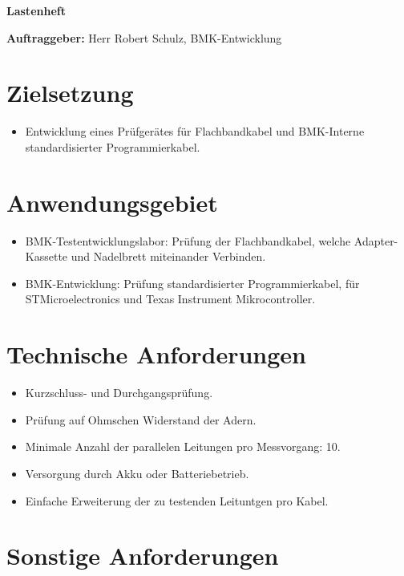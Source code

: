 \documentclass[a4paper,11pt]{scrartcl}
\begin{document}
\begin{center}
	\begin{huge}
	\textbf{Lastenheft}
	\end{huge}
\end{center}

\textbf{Auftraggeber:}
Herr Robert Schulz, BMK-Entwicklung


\section{Zielsetzung}

\begin{itemize}
	\item{Entwicklung eines Prüfgerätes für Flachbandkabel und BMK-Interne standardisierter Programmierkabel.}	
\end{itemize}

\section{Anwendungsgebiet}

\begin{itemize}
	\item{BMK-Testentwicklungslabor: Prüfung der Flachbandkabel, welche Adapter-Kassette und Nadelbrett miteinander Verbinden.}
	
	\item{BMK-Entwicklung: Prüfung standardisierter Programmierkabel, für STMicroelectronics und Texas Instrument Mikrocontroller.}
\end{itemize}

\section{Technische Anforderungen}

\begin{itemize}
	\item{Kurzschluss- und Durchgangsprüfung.}
	\item{Prüfung auf Ohmschen Widerstand der Adern.}
	\item{Minimale Anzahl der parallelen Leitungen pro Messvorgang: 10.}
	\item{Versorgung durch Akku oder Batteriebetrieb.}
	\item{Einfache Erweiterung der zu testenden Leituntgen pro Kabel.}
\end{itemize}

\section{Sonstige Anforderungen}
\end{document}
